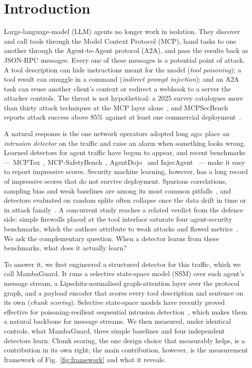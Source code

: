 \documentclass[conference,compsoc]{IEEEtran}
\begin{document}
\section{Introduction}
\label{sec:intro}
Large-language-model (LLM) agents no longer work in isolation. They discover and call tools through the Model Context Protocol (MCP), hand tasks to one another through the Agent-to-Agent protocol (A2A), and pass the results back as JSON-RPC messages. Every one of these messages is a potential point of attack. A tool description can hide instructions meant for the model (\emph{tool poisoning}); a tool result can smuggle in a command (\emph{indirect prompt injection}); and an A2A task can reuse another client's context or redirect a webhook to a server the attacker controls. The threat is not hypothetical: a 2025 survey catalogues more than thirty attack techniques at the MCP layer alone~\cite{Hou2025MCP}, and MCPSecBench reports attack success above $85\%$ against at least one commercial deployment~\cite{Yang2025MCPSec}.

A natural response is the one network operators adopted long ago: place an \emph{intrusion detector} on the traffic and raise an alarm when something looks wrong. Learned detectors for agent traffic have begun to appear, and recent benchmarks --- MCPTox~\cite{Wang2025MCPTox}, MCP-SafetyBench~\cite{Zong2026SafetyBench}, AgentDojo~\cite{Debenedetti2024AgentDojo} and InjecAgent~\cite{Zhan2024InjecAgent} --- make it easy to report impressive scores. Security machine learning, however, has a long record of impressive scores that do not survive deployment. Spurious correlations, sampling bias and weak baselines are among its most common pitfalls~\cite{Arp2022DosDonts}, and detectors evaluated on random splits often collapse once the data drift in time or in attack family~\cite{Pendlebury2019Tesseract}. A concurrent study reaches a related verdict from the defence side: simple firewalls placed at the tool interface saturate four agent-security benchmarks, which the authors attribute to weak attacks and flawed metrics~\cite{Bhagwatkar2025Firewalls}. We ask the complementary question. When a detector learns from these benchmarks, what does it actually learn?

To answer it, we first engineered a structured detector for this traffic, which we call MambaGuard. It runs a selective state-space model (SSM) over each agent's message stream, a Lipschitz-normalised graph-attention layer over the protocol graph, and a payload encoder that scores every tool description and sentence on its own (\emph{chunk scoring}). Selective state-space models have recently proved effective for poisoning-resilient sequential intrusion detection~\cite{Anaedevha2026MambaShield}, which makes them a natural backbone for message streams. We then measured, under identical controls, what MambaGuard, three simple baselines and four independent detectors learn. Chunk scoring, the one design choice that measurably helps, is a contribution in its own right; the main contribution, however, is the measurement framework of Fig.~\ref{fig:framework} and what it reveals.
\end{document}
